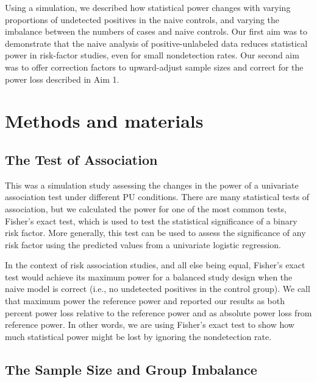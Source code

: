 \documentclass[
]{article}
\begin{document}
Using a simulation, we described how statistical power changes with
varying proportions of undetected positives in the naive controls, and
varying the imbalance between the numbers of cases and naive controls.
Our first aim was to demonstrate that the naive analysis of
positive-unlabeled data reduces statistical power in risk-factor
studies, even for small nondetection rates. Our second aim was to offer
correction factors to upward-adjust sample sizes and correct for the
power loss described in Aim 1.

\hypertarget{methods-and-materials}{%
\section{Methods and materials}\label{methods-and-materials}}

\hypertarget{the-test-of-association}{%
\subsection{The Test of Association}\label{the-test-of-association}}

This was a simulation study assessing the changes in the power of a
univariate association test under different PU conditions. There are
many statistical tests of association, but we calculated the power for
one of the most common tests, Fisher's exact test, which is used to test
the statistical significance of a binary risk factor. More generally,
this test can be used to assess the significance of any risk factor
using the predicted values from a univariate logistic regression.

In the context of risk association studies, and all else being equal,
Fisher's exact test would achieve its maximum power for a balanced study
design when the naive model is correct (i.e., no undetected positives in
the control group). We call that maximum power the reference power and
reported our results as both percent power loss relative to the
reference power and as absolute power loss from reference power. In
other words, we are using Fisher's exact test to show how much
statistical power might be lost by ignoring the nondetection rate.

\hypertarget{the-sample-size-and-group-imbalance}{%
\subsection{The Sample Size and Group
Imbalance}\label{the-sample-size-and-group-imbalance}}
\end{document}
